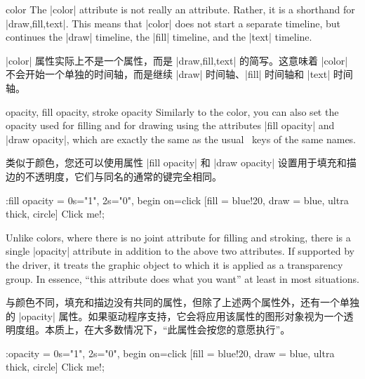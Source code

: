 \begin{tikzanimateattribute}{color}
    The |color| attribute is not really an attribute. Rather, it is a shorthand
    for |{draw,fill,text}|. This means that |color| does not start a separate
    timeline, but continues the |draw| timeline, the |fill| timeline, and the
    |text| timeline.

    |color| 属性实际上不是一个属性，而是 |{draw,fill,text}| 的简写。这意味着 |color| 不会开始一个单独的时间轴，而是继续 |draw| 时间轴、|fill| 时间轴和 |text| 时间轴。


\end{tikzanimateattribute}

\begin{tikzanimateattribute}{opacity, fill opacity, stroke opacity}
    Similarly to the color, you can also set the opacity used for filling and
    for drawing using the attributes |fill opacity| and |draw opacity|, which
    are exactly the same as the usual \tikzname\ keys of the same names.
    
    类似于颜色，您还可以使用属性 |fill opacity| 和 |draw opacity| 设置用于填充和描边的不透明度，它们与同名的通常的\tikzname 键完全相同。


\begin{codeexample}[
    preamble={\usetikzlibrary{animations}},
    animation list={0.5,1,1.5,2},
]
\tikz \node :fill opacity = { 0s="1", 2s="0", begin on=click }
  [fill = blue!20, draw = blue, ultra thick, circle] {Click me!};
\end{codeexample}
    Unlike colors, where there is no joint attribute for filling and stroking,
    there is a single |opacity| attribute in addition to the above two
    attributes. If supported by the driver, it treats the graphic object to
    which it is applied as a transparency group. In essence, ``this attribute
    does what you want'' at least in most situations.
    
    与颜色不同，填充和描边没有共同的属性，但除了上述两个属性外，还有一个单独的 |opacity| 属性。如果驱动程序支持，它会将应用该属性的图形对象视为一个透明度组。本质上，在大多数情况下，“此属性会按您的意愿执行”。


\begin{codeexample}[
    preamble={\usetikzlibrary{animations}},
    animation list={0.5,1,1.5,2},
]
\tikz \node :opacity = { 0s="1", 2s="0", begin on=click }
  [fill = blue!20, draw = blue, ultra thick, circle] {Click me!};
\end{codeexample}
\end{tikzanimateattribute}


